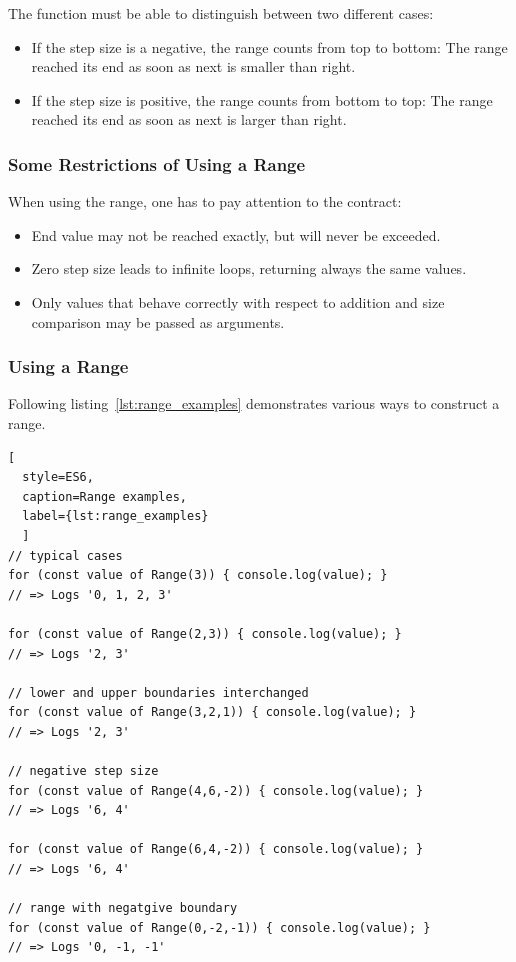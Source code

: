 The function must be able to distinguish between two different cases:

\begin{itemize}
  \item If the step size is a negative, the range counts from top to bottom:
    The range reached its end as soon as next is smaller than right.
  \item If the step size is positive, the range counts from bottom to top: The
  range reached its end as soon as next is larger than right.
\end{itemize}

\subsubsection{Some Restrictions of Using a Range}
\label{subsub:Some Restrictions of Using a Range}
When using the range, one has to pay attention to the contract:
\begin{itemize}
\item End value may not be reached exactly, but will never be exceeded.
  \item Zero step size leads to infinite loops, returning always the same values.
  \item Only values that behave correctly with respect to addition and size
    comparison may be passed as arguments.
\end{itemize}


\subsubsection{Using a Range}
\label{subsub:Using a Range}
Following listing~\ref{lst:range_examples} demonstrates various ways to
construct a range.

\begin{lstlisting}[
  style=ES6, 
  caption=Range examples,
  label={lst:range_examples}
  ]
// typical cases
for (const value of Range(3)) { console.log(value); }
// => Logs '0, 1, 2, 3'

for (const value of Range(2,3)) { console.log(value); }
// => Logs '2, 3'

// lower and upper boundaries interchanged
for (const value of Range(3,2,1)) { console.log(value); }
// => Logs '2, 3'

// negative step size
for (const value of Range(4,6,-2)) { console.log(value); }
// => Logs '6, 4'

for (const value of Range(6,4,-2)) { console.log(value); }
// => Logs '6, 4'

// range with negatgive boundary
for (const value of Range(0,-2,-1)) { console.log(value); }
// => Logs '0, -1, -1'
\end{lstlisting}

